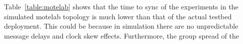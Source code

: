 Table~\ref{table:motelab} shows that the time to sync of the experiments in the simulated motelab topology
is much lower than that of the actual testbed deployment.  This could be because in simulation there are no
unpredictable message delays and clock skew effects.  Furthermore, the group spread of the 